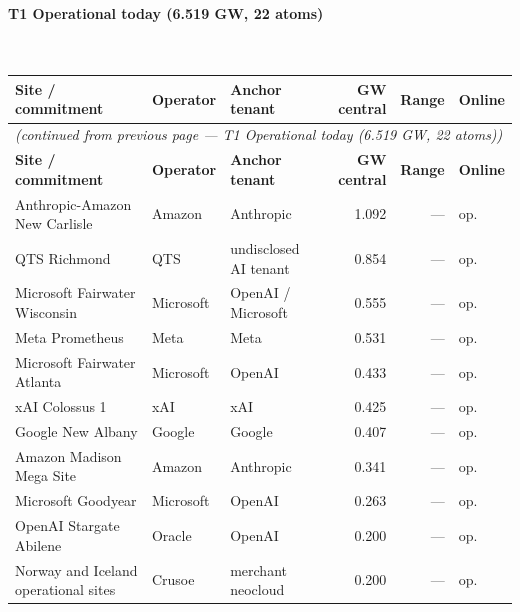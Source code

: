 \paragraph{\textbf{T1 Operational today (6.519 GW, 22 atoms)}}~\\[0.3em]
\noindent\begin{small}
\begin{longtable}{@{}p{4.5cm} p{2.4cm} p{2.4cm} r r p{1.8cm}@{}}
\toprule
\textbf{Site / commitment} & \textbf{Operator} & \textbf{Anchor tenant} & \textbf{GW central} & \textbf{Range} & \textbf{Online} \\
\midrule
\endfirsthead
\multicolumn{6}{l}{\textit{(continued from previous page — T1 Operational today (6.519 GW, 22 atoms))}} \\
\toprule
\textbf{Site / commitment} & \textbf{Operator} & \textbf{Anchor tenant} & \textbf{GW central} & \textbf{Range} & \textbf{Online} \\
\midrule
\endhead
\bottomrule
\endfoot

Anthropic-Amazon New Carlisle & Amazon & Anthropic & 1.092 & — & op. \\

QTS Richmond & QTS & undisclosed AI tenant & 0.854 & — & op. \\

Microsoft Fairwater Wisconsin & Microsoft & OpenAI / Microsoft & 0.555 & — & op. \\

Meta Prometheus & Meta & Meta & 0.531 & — & op. \\

Microsoft Fairwater Atlanta & Microsoft & OpenAI & 0.433 & — & op. \\

xAI Colossus 1 & xAI & xAI & 0.425 & — & op. \\

Google New Albany & Google & Google & 0.407 & — & op. \\

Amazon Madison Mega Site & Amazon & Anthropic & 0.341 & — & op. \\

Microsoft Goodyear & Microsoft & OpenAI & 0.263 & — & op. \\

OpenAI Stargate Abilene & Oracle & OpenAI & 0.200 & — & op. \\

Norway and Iceland operational sites & Crusoe & merchant neocloud & 0.200 & — & op. \\


\end{longtable}
\end{small}

